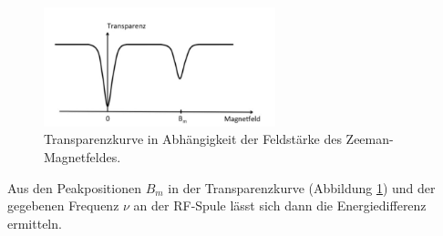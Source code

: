 \begin{figure}[H]
  \centering
  \includegraphics[width=0.6\textwidth]{plots/transfeld.JPG}
  \caption{Transparenzkurve in Abhängigkeit der Feldstärke des Zeeman-Magnetfeldes\cite{Anleitung}.}
  \label{fig:transfeld}
\end{figure}
Aus den Peakpositionen $B_m$ in der Transparenzkurve (Abbildung \ref{fig:transfeld}) und der gegebenen Frequenz $\nu$ an der RF-Spule lässt sich dann die Energiedifferenz ermitteln.

